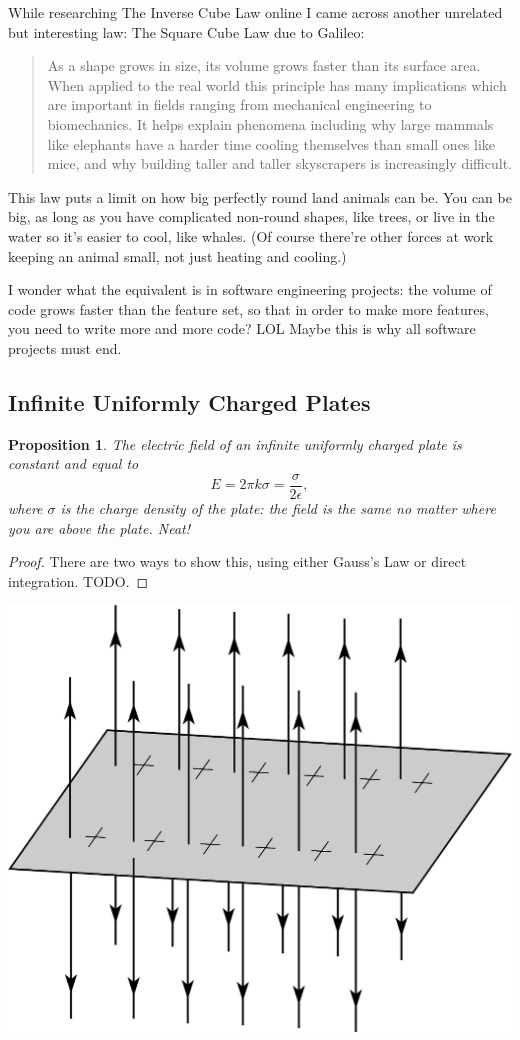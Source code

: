 \documentclass[12pt]{article}
\theoremstyle{plain}
\newtheorem{proposition}[theorem]{Proposition}
\theoremstyle{definition}
\theoremstyle{remark}
\begin{document}
While researching The Inverse Cube Law online I came across another unrelated
but interesting law: The Square Cube Law due to Galileo:

\begin{quote}
As a shape grows in size, its volume grows faster than its surface area. When
applied to the real world this principle has many implications which are
important in fields ranging from mechanical engineering to biomechanics. It
helps explain phenomena including why large mammals like elephants have a harder
time cooling themselves than small ones like mice, and why building taller and
taller skyscrapers is increasingly difficult.
\end{quote}

This law puts a limit on how big perfectly round land animals can be. You can be
big, as long as you have complicated non-round shapes, like trees, or live in
the water so it's easier to cool, like whales. (Of course there're other forces
at work keeping an animal small, not just heating and cooling.)

I wonder what the equivalent is in software engineering projects: the volume of
code grows faster than the feature set, so that in order to make more features,
you need to write more and more code? LOL Maybe this is why all software
projects must end.

\subsection{Infinite Uniformly Charged Plates}

\begin{proposition}
The electric field of an infinite uniformly charged plate is constant and equal to $$E = 2 \pi k \sigma = \frac{\sigma}{2 \epsilon},$$ where $\sigma$ is the charge density of the plate: the field is the same no matter where you are above the plate. Neat!
\end{proposition}

\begin{proof}
There are two ways to show this, using either Gauss's Law or direct integration. TODO.
\end{proof}

\centerline{\includegraphics[width=.7\textwidth]{infiniteplate}}
\end{document}
